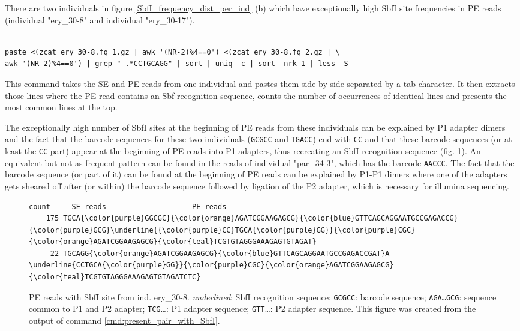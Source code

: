 \documentclass[a4paper,12pt,times,authoryear,twoside,print,index]{Classes/PhDThesisPSnPDF}\usepackage[]{graphicx}\usepackage[]{color}
\begin{document}
There are two individuals in figure \ref{SbfI_frequency_dist_per_ind} (b) which have exceptionally high SbfI site frequencies in PE reads (individual "ery\_30-8" and individual "ery\_30-17").
%
\begin{cmd}
\captionsetup{type=cmd} %
\begin{Verbatim}[formatcom=\color{darkgray}, fontsize=\scriptsize]

paste <(zcat ery_30-8.fq_1.gz | awk '(NR-2)%4==0') <(zcat ery_30-8.fq_2.gz | \
awk '(NR-2)%4==0') | grep " .*CCTGCAGG" | sort | uniq -c | sort -nrk 1 | less -S
\end{Verbatim}
\caption{\small This command takes the SE and PE reads from one individual and pastes them side by side separated by a tab character. It then extracts those lines where the PE read contains an Sbf recognition sequence, counts the number of occurrences of identical lines and presents the most common lines at the top.}
\label{cmd:present_pair_with_SbfI}
\end{cmd}
%
The exceptionally high number of SbfI sites at the beginning of PE reads from these individuals can be explained by P1 adapter dimers and the fact that the barcode sequences for these two individuals (\texttt{GCGCC} and \texttt{TGACC}) end with \texttt{CC} and that these barcode sequences (or at least the \texttt{CC} part) appear at the beginning of PE reads into P1 adapters, thus recreating an SbfI recognition sequence (fig. \ref{SbfI_in_PE_reads_of_ery_30-8}). An equivalent but not as frequent pattern can be found in the reads of individual "par\_34-3", which has the barcode \texttt{AACCC}. The fact that the barcode sequence (or part of it) can be found at the beginning of PE reads can be explained by P1-P1 dimers where one of the adapters gets sheared off after (or within) the barcode sequence followed by ligation of the P2 adapter, which is necessary for illumina sequencing. 
%
\begin{figure}
\begin{Verbatim}[fontfamily=courier, fontsize=\tiny, commandchars=\\\{\}]
  count		SE reads					PE reads
    175 TGCA{\color{purple}GGCGC}{\color{orange}AGATCGGAAGAGCG}{\color{blue}GTTCAGCAGGAATGCCGAGACCG} {\color{purple}GCG}\underline{{\color{purple}CC}TGCA{\color{purple}GG}}{\color{purple}CGC}{\color{orange}AGATCGGAAGAGCG}{\color{teal}TCGTGTAGGGAAAGAGTGTAGAT}
     22 TGCAGG{\color{orange}AGATCGGAAGAGCG}{\color{blue}GTTCAGCAGGAATGCCGAGACCGAT}A \underline{CCTGCA{\color{purple}GG}}{\color{purple}CGC}{\color{orange}AGATCGGAAGAGCG}{\color{teal}TCGTGTAGGGAAAGAGTGTAGATCTC}
\end{Verbatim}
\caption{PE reads with SbfI site from ind. ery\_30-8. \emph{underlined}: SbfI recognition sequence; {\color{purple}\texttt{GCGCC}}: barcode sequence; {\color{orange}\texttt{AGA\ldots GCG}}: sequence common to P1 and P2 adapter; {\color{teal}\texttt{TCG}\ldots}: P1 adapter sequence; {\color{blue}\texttt{GTT}\ldots}: P2 adapter sequence. This figure was created from the output of command \ref{cmd:present_pair_with_SbfI}.}
\label{SbfI_in_PE_reads_of_ery_30-8}
\end{figure}
\end{document}
